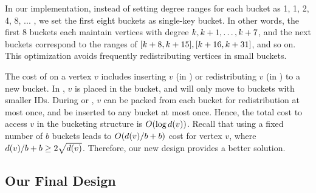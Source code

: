 In our implementation, instead of setting degree ranges for each bucket as 1, 1, 2, 4, 8, ... , 
we set the first eight buckets as single-key bucket. 
In other words, the first 8 buckets each maintain vertices with degree $k,k+1, \ldots, k+7$, 
and the next buckets correspond to the ranges of $[k+8,k+15], [k+16, k+31]$, and so on.
This optimization avoids frequently redistributing vertices in small buckets. 

The cost of \HBS{} on a vertex $v$ includes inserting $v$ (in \FUpdate{}) or redistributing $v$ (in \FGetNextBucket{}) to a new bucket. 
In \FBuildBuckets{}, $v$ is placed in the  bucket, and will only move to buckets with smaller IDs. 
During \FUpdate{} or \FGetNextBucket{}, $v$ can be packed from each bucket for redistribution at most once, and be inserted to any bucket at most once. 
Hence, the total cost to access $v$ in the bucketing structure is $O(\log d(v))$. 
Recall that using a fixed number of $b$ buckets leads to $O(d(v)/b+b)$ cost for vertex $v$, 
where $d(v)/b+b\ge 2\sqrt{d(v)}$.
Therefore, our new design provides a better solution. 


\subsection{Our Final Design}

